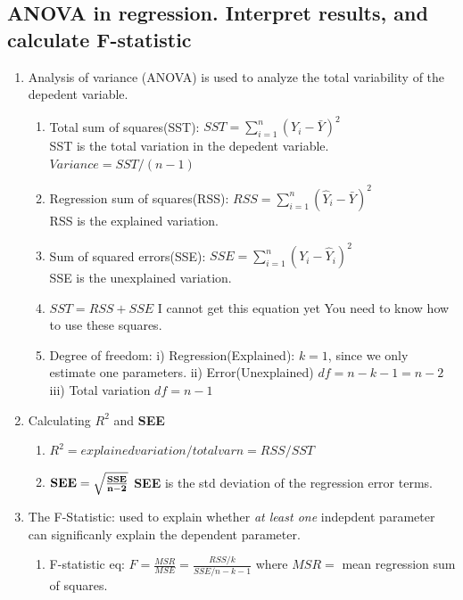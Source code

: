 \documentclass{article}
\begin{document}
\subsection{ANOVA in regression. Interpret results, and calculate F-statistic}
\begin{enumerate}
    \item Analysis of variance (ANOVA) is used to analyze the total variability 
        of the depedent variable. 
        \begin{enumerate}
            \item Total sum of squares(SST): $SST=\sum_{i=1}^n(Y_i-\bar Y)^2$
                \\SST is the total variation in the depedent variable.
                $Variance=SST/(n-1)$
            \item Regression sum of squares(RSS): $RSS=\sum_{i=1}^n(\hat{Y}_i-\bar Y)^2$
                \\RSS is the explained variation.
            \item Sum of squared errors(SSE): $SSE=\sum_{i=1}^n(Y_i-\hat{Y}_i)^2$
                \\SSE is the unexplained variation.
            \item {\color{red}$SST = RSS+SSE$ I cannot get this equation yet}
                You need to know how to use these squares.
            \item Degree of freedom: i) Regression(Explained): $k=1$, since we only
                estimate one parameters.
                ii) Error(Unexplained) $df=n-k-1=n-2$
                iii) Total variation $df=n-1$
        \end{enumerate}
    \item Calculating $R^2$ and {\bf SEE}
        \begin{enumerate}
            \item $R^2=explained variation/total varn=RSS/SST$
            \item $\bf{SEE}=\sqrt\frac{SSE}{n-2}$ {\bf SEE} is the std deviation of the
                regression error terms.
        \end{enumerate}
    \item The F-Statistic: used to explain whether {\it at least one} indepdent parameter
        can significanly explain the dependent parameter.  
        \begin{enumerate}
            \item F-statistic eq: $F=\frac{MSR}{MSE}=\frac{RSS/k}{SSE/n-k-1}$
                 where $MSR=$ mean regression sum of squares.

\end{enumerate}
\end{enumerate}
\end{document}
